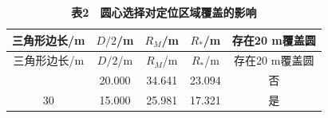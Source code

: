 \begin{longtable}[]{@{}ccccc@{}}
\caption{\textbf{表2　圆心选择对定位区域覆盖的影响}}\tabularnewline
\toprule\noalign{}
三角形边长/m & \(D/2\)/m & \(R_M\)/m & \(R_*\)/m & 存在20 m覆盖圆 \\
\midrule\noalign{}
\endfirsthead
\toprule\noalign{}
三角形边长/m & \(D/2\)/m & \(R_M\)/m & \(R_*\)/m & 存在20 m覆盖圆 \\
\midrule\noalign{}
\endhead
\bottomrule\noalign{}
\endlastfoot
40 & 20.000 & 34.641 & 23.094 & 否 \\
30 & 15.000 & 25.981 & 17.321 & 是 \\
\end{longtable}
